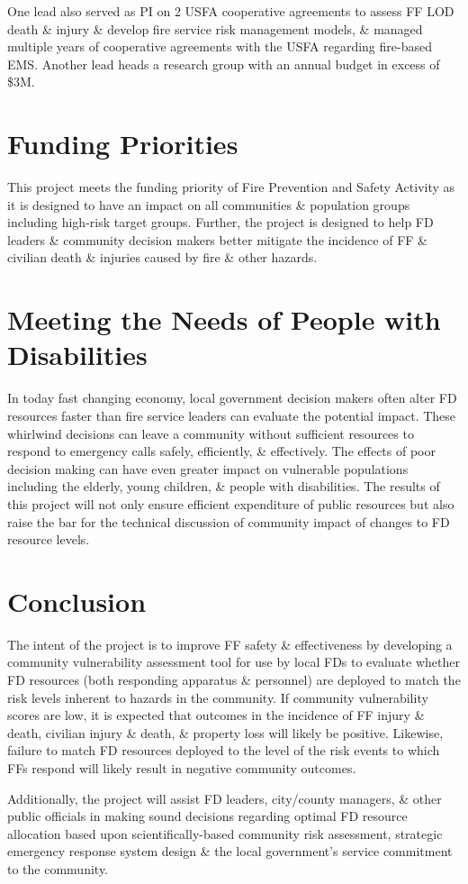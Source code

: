\documentclass[12pt,letterpaper]{article}
\begin{document}
One lead also served as PI on 2 USFA cooperative agreements to assess FF LOD death \& injury \& develop fire service risk management models, \& managed multiple years of cooperative agreements with the USFA regarding fire-based EMS.  Another lead heads a research group with an annual budget in excess of \$3M.

\section{Funding Priorities}
\label{sec:fund}
This project meets the funding priority of Fire Prevention and Safety Activity as it is designed to have an impact on all communities \& population groups including high-risk target groups.  Further, the project is designed to help FD leaders \& community decision makers better mitigate the incidence of FF \& civilian death \& injuries caused by fire \& other hazards. 

\section{Meeting the Needs of People with Disabilities}
\label{sec:dis}
In today fast changing economy, local government decision makers often alter FD resources faster than fire service leaders can evaluate the potential impact. These whirlwind decisions can leave a community without sufficient resources to respond to emergency calls safely, efficiently, \& effectively.  The effects of poor decision making can have even greater impact on vulnerable populations including the elderly, young children, \& people with disabilities.  The results of this project will not only ensure efficient expenditure of public resources but also raise the bar for the technical discussion of community impact of changes to FD resource levels.  

\section{Conclusion}
\label{sec:conclusions}
The intent of the project is to improve FF safety \& effectiveness by developing a community vulnerability assessment tool for use by local FDs to evaluate whether FD resources (both responding apparatus \& personnel) are deployed to match the risk levels inherent to hazards in the community.  If community vulnerability scores are low, it is expected that outcomes in the incidence of FF injury \& death, civilian injury \& death, \& property loss will likely be positive. Likewise, failure to match FD resources deployed to the level of the risk events to which FFs respond will likely result in negative community outcomes. 

Additionally, the project will assist FD leaders, city/county managers, \& other public officials in making sound decisions regarding optimal FD resource allocation based upon scientifically-based community risk assessment, strategic emergency response system design \& the local government’s service commitment to the community.  




\end{document}
